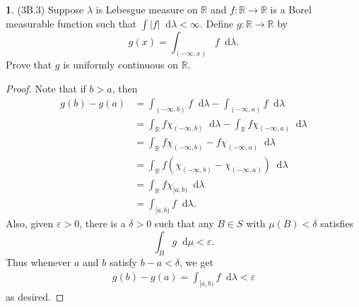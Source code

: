 \documentclass[12pt]{article}
\newcommand{\dd}{\mathop{}\!\mathrm{d}}
\theoremstyle{definition}
\newtheorem{ex}{}
\begin{document}
\begin{ex}
	(3B.3)
	Suppose $\lambda$ is Lebesgue measure on $\mathbb{R}$ and $f : \mathbb{R} \to \mathbb{R}$ is a Borel measurable function such that $\int |f| \dd \lambda < \infty$.
	Define $g : \mathbb{R} \to \mathbb{R}$ by \begin{equation*}
		g(x) = \int_{(-\infty, x)} f \dd \lambda.
	\end{equation*}
	Prove that $g$ is uniformly continuous on $\mathbb{R}$.
\end{ex}
\begin{proof}
	Note that if $b > a$, then \begin{align*}
		g(b) - g(a) & = \int_{(-\infty, b)} f \dd \lambda - \int_{(-\infty, a)} f \dd \lambda                                   \\
		            & = \int_{\mathbb{R}} f\chi_{(-\infty, b)} \dd \lambda - \int_{\mathbb{R}} f\chi_{(-\infty, a)} \dd \lambda \\
		            & = \int_{\mathbb{R}} f\chi_{(-\infty, b)} - f\chi_{(-\infty, a)} \dd \lambda                               \\
		            & = \int_{\mathbb{R}} f\left(\chi_{(-\infty, b)} - \chi_{(-\infty, a)}\right) \dd \lambda                   \\
		            & = \int_{\mathbb{R}} f\chi_{[a, b)} \dd \lambda                                                            \\
		            & = \int_{[a, b)} f \dd \lambda.
	\end{align*}
	Also, given $\varepsilon > 0$, there is a $\delta > 0$ such that any $B \in S$ with $\mu(B) < \delta$ satisfies \begin{equation*}
		\int_B g \dd \mu < \varepsilon.
	\end{equation*}
	Thus whenever $a$ and $b$ satisfy $b - a < \delta$, we get \begin{align*}
		g(b) - g(a) = \int_{[a, b)} f \dd\lambda < \varepsilon
	\end{align*}
	as desired.
\end{proof}
\end{document}
